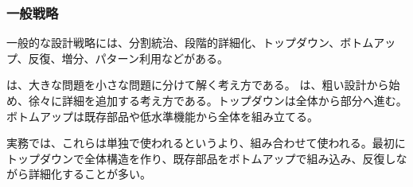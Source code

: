 \subsubsection{一般戦略}

一般的な設計戦略には、分割統治、段階的詳細化、トップダウン、ボトムアップ、反復、増分、パターン利用などがある。

 は、大きな問題を小さな問題に分けて解く考え方である。 は、粗い設計から始め、徐々に詳細を追加する考え方である。トップダウンは全体から部分へ進む。ボトムアップは既存部品や低水準機能から全体を組み立てる。

実務では、これらは単独で使われるというより、組み合わせて使われる。最初にトップダウンで全体構造を作り、既存部品をボトムアップで組み込み、反復しながら詳細化することが多い。
